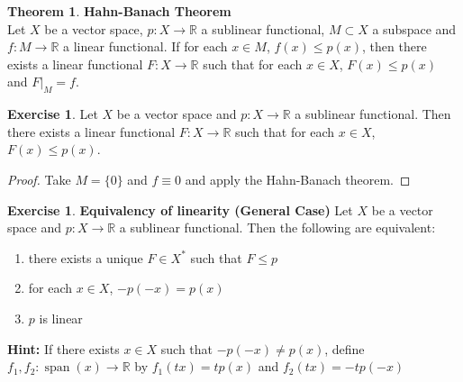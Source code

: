 \documentclass[12pt]{amsart}
\theoremstyle{definition}
\newtheorem{thm}[definition]{Theorem}
\newtheorem{ex}[definition]{Exercise}
\newcommand{\R}{\mathbb{R}}
\DeclareMathOperator{\spn}{span}
\newcommand{\lex}[1]{\label{ex:#1}}
\begin{document}
	\begin{thm}\textbf{Hahn-Banach Theorem}\\
		Let $X$ be a vector space, $p:X \rightarrow \R$ a sublinear functional, $M \subset X$ a subspace and $f:M \rightarrow \R$ a linear functional. If for each $x \in M$, $ f(x)  \leq p(x)$, then there exists a linear functional $F:X \rightarrow \R$ such that for each $x \in X$, $F(x) \leq p(x)$ and $F|_{M}=f$.
	\end{thm}
	
	\begin{ex} \lex{}
	Let $X$ be a vector space and $p:X \rightarrow \R$ a sublinear functional. Then there exists a linear functional $F: X \rightarrow \R$ such that for each $x \in X$, $F(x) \leq p(x)$.
	\end{ex}
	
	\begin{proof}
	Take $M = \{0\}$ and $f \equiv 0$ and apply the Hahn-Banach theorem.
	\end{proof}	
	
	\begin{ex} \lex{}\textbf{Equivalency of linearity (General Case)}
	Let $X$ be a vector space and $p:X \rightarrow \R$ a sublinear functional. Then the following are equivalent:
	\begin{enumerate}
	\item there exists a unique $F \in X^*$ such that $F \leq p$
	\item for each $x \in X$, $-p(-x) = p(x)$
	\item $p$ is linear
\end{enumerate}	
\textbf{Hint:} If there exists $x \in X$ such that $-p(-x) \neq p(x)$, define $f_1,f_2 :\spn(x) \rightarrow \R$ by $f_1(tx) = t p(x)$ and $f_2(tx) = -tp(-x)$
	\end{ex}	
	
\end{document}

